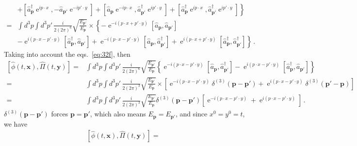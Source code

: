 \begin{frame}
\begin{align}
&\left.
+\left[\widehat{a}_\mathbf{p}^\dagger \operatorname{e}^{i p\cdot x },-\widehat{a}_{\mathbf{p}'} \operatorname{e}^{-i p'\cdot y }\right]
+\left[\widehat{a}_\mathbf{p} \operatorname{e}^{-i p\cdot x },\widehat{a}_{\mathbf{p}'}^\dagger \operatorname{e}^{i p'\cdot y }\right]
+\left[\widehat{a}_\mathbf{p}^\dagger \operatorname{e}^{i p\cdot x },\widehat{a}_{\mathbf{p}'}^\dagger \operatorname{e}^{i p'\cdot y }\right]
\right\}\nonumber\\
=&
\int d^3p\int d^3p'\,\frac{i}{2(2\pi)^6}\sqrt{\frac{E_{\mathbf{p}'}}{E_{\mathbf{p}}}}\times\left\{ 
-\operatorname{e}^{-i (p\cdot x+p'\cdot y) }\left[\widehat{a}_\mathbf{p} ,\widehat{a}_{\mathbf{p}'} \right]\right.\nonumber\\
&\left.
-\operatorname{e}^{i (p\cdot x- p'\cdot y) }\left[\widehat{a}_\mathbf{p}^\dagger ,\widehat{a}_{\mathbf{p}'} \right]
+\operatorname{e}^{-i (p\cdot x- p'\cdot y) }\left[\widehat{a}_\mathbf{p} ,\widehat{a}_{\mathbf{p}'}^\dagger \right]
+\operatorname{e}^{i (p\cdot x+ p'\cdot y) }\left[\widehat{a}_\mathbf{p}^\dagger ,\widehat{a}_{\mathbf{p}'}^\dagger \right]
\right\}\,.
\end{align}
Taking into account the eqs.~\eqref{eq:32f}, then
\begin{align}
  \left[\widehat{\phi}(t,\mathbf{x}),\widehat{\Pi}(t,\mathbf{y})\right]=&
\int d^3p\int d^3p'\,\frac{i}{2(2\pi)^6}\sqrt{\frac{E_{\mathbf{p}'}}{E_{\mathbf{p}}}}\left\{ 
\operatorname{e}^{-i (p\cdot x- p'\cdot y) }\left[\widehat{a}_\mathbf{p} ,\widehat{a}_{\mathbf{p}'}^\dagger \right]
-\operatorname{e}^{i (p\cdot x- p'\cdot y) }\left[\widehat{a}_\mathbf{p}^\dagger ,\widehat{a}_{\mathbf{p}'} \right]
\right\}\nonumber\\
=&
\int d^3p\int d^3p'\,\frac{i}{2(2\pi)^3}\sqrt{\frac{E_{\mathbf{p}'}}{E_{\mathbf{p}}}}\times\left[
\operatorname{e}^{-i (p\cdot x- p'\cdot y) }\delta^{(3)}(\mathbf{p}-\mathbf{p}')
+\operatorname{e}^{i (p\cdot x- p'\cdot y) }\delta^{(3)}(\mathbf{p}'-\mathbf{p}) 
\right]\nonumber\\
=&
\int d^3p\int d^3p'\,\frac{i}{2(2\pi)^3}\sqrt{\frac{E_{\mathbf{p}'}}{E_{\mathbf{p}}}}\delta^{(3)}(\mathbf{p}-\mathbf{p}')\left[
\operatorname{e}^{-i (p\cdot x- p'\cdot y) }
+\operatorname{e}^{i (p\cdot x- p'\cdot y) }
\right]\,.
\end{align}
$\delta^{(3)}(\mathbf{p}-\mathbf{p}')$ forces $\mathbf{p}=\mathbf{p}'$, which also means $E_{\mathbf{p}}=E_{\mathbf{p}'}$, and since $x^0=y^0=t$, we have
\begin{align}
  \left[\widehat{\phi}(t,\mathbf{x}),\widehat{\Pi}(t,\mathbf{y})\right]=&

\end{align}
\end{frame}
